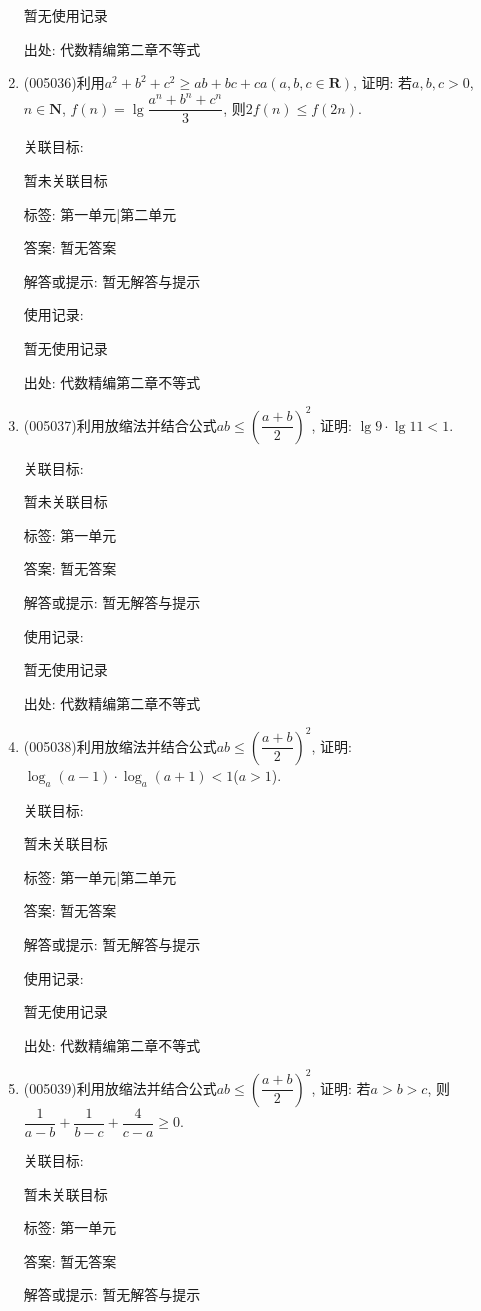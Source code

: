 \documentclass[10pt,a4paper]{article}
\begin{document}
\begin{enumerate}[1.]
暂无使用记录


出处: 代数精编第二章不等式
\item { (005036)}利用$a^2+b^2+c^2\ge ab+bc+ca(a,b,c\in \mathbf{R})$, 证明: 若$a,b,c>0$, $n\in \mathbf{N}$, $f(n)=\lg \dfrac{a^n+b^n+c^n}3$, 则$2f(n)\le f(2n)$.


关联目标:

暂未关联目标



标签: 第一单元|第二单元

答案: 暂无答案

解答或提示: 暂无解答与提示

使用记录:

暂无使用记录


出处: 代数精编第二章不等式
\item { (005037)}利用放缩法并结合公式$ab\le (\dfrac{a+b}2)^2$, 证明: $\lg 9\cdot \lg 11<1$.


关联目标:

暂未关联目标



标签: 第一单元

答案: 暂无答案

解答或提示: 暂无解答与提示

使用记录:

暂无使用记录


出处: 代数精编第二章不等式
\item { (005038)}利用放缩法并结合公式$ab\le (\dfrac{a+b}2)^2$, 证明: $\log_a(a-1)\cdot \log_a(a+1)<1$($a>1$).


关联目标:

暂未关联目标



标签: 第一单元|第二单元

答案: 暂无答案

解答或提示: 暂无解答与提示

使用记录:

暂无使用记录


出处: 代数精编第二章不等式
\item { (005039)}利用放缩法并结合公式$ab\le (\dfrac{a+b}2)^2$, 证明: 若$a>b>c$, 则$\dfrac 1{a-b}+\dfrac 1{b-c}+\dfrac 4{c-a}\ge 0$.


关联目标:

暂未关联目标



标签: 第一单元

答案: 暂无答案

解答或提示: 暂无解答与提示


\end{enumerate}
\end{document}
